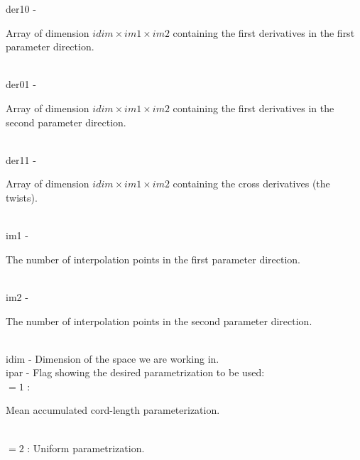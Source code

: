         \>\>    {\fov der10}  \> - \>
        \begin{minipg2}
          Array of dimension $idim\times im1\times im2$ containing
          the first derivatives in the first parameter direction.
        \end{minipg2}\\
        \>\>    {\fov der01}  \> - \>
        \begin{minipg2}
          Array of dimension $idim\times im1\times im2$ containing the
          first derivatives in the second parameter direction.
        \end{minipg2}\\[0.8ex]
        \>\>    {\fov der11}  \> - \>
        \begin{minipg2}
          Array of dimension $idim\times im1\times im2$ containing the
          cross derivatives (the twists).
        \end{minipg2}\\[0.8ex]
        \>\>    {\fov im1}  \> - \>
        \begin{minipg2}
          The number of interpolation points in the first parameter
          direction.
        \end{minipg2}\\[0.8ex]
        \>\>    {\fov im2}  \> - \>
        \begin{minipg2}
          The number of interpolation points in the second parameter
          direction.
        \end{minipg2}\\[0.8ex]
        \>\>    {\fov idim} \> - \> Dimension of the space we are working in.\\
        \>\>    {\fov ipar} \> - \> Flag showing the desired
                                    parametrization to be used:\\
                 \>\>\>\>\> $= 1$ : \begin{minipg5}
                                      Mean accumulated cord-length
                                      parameterization.
                                    \end{minipg5}\\[0.3ex]
                 \>\>\>\>\> $= 2$ : Uniform parametrization.\\
